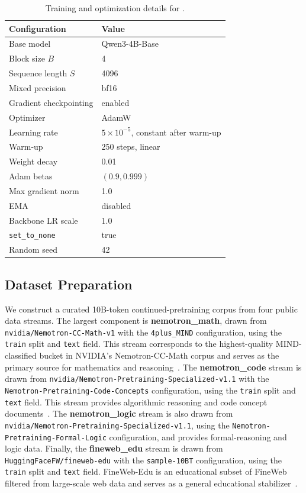 \begin{table}[!htbp]
\centering
\caption{
Training and optimization details for \method. 
}
\label{tab:training_details}
\setlength{\tabcolsep}{5pt}
\renewcommand{\arraystretch}{1.12}
\begin{tabular}{ll}
\toprule
\textbf{Configuration} & \textbf{Value} \\
\midrule
Base model & Qwen3-4B-Base \\
Block size $B$ & 4 \\
Sequence length $S$ & 4096 \\
Mixed precision & bf16 \\
Gradient checkpointing & enabled \\
\midrule
Optimizer & AdamW \\
Learning rate & $5\times10^{-5}$, constant after warm-up \\
Warm-up & 250 steps, linear \\
Weight decay & 0.01 \\
Adam betas & $(0.9, 0.999)$ \\
Max gradient norm & 1.0 \\
EMA & disabled \\
Backbone LR scale & 1.0 \\
\texttt{set\_to\_none} & true \\
Random seed & 42 \\
\bottomrule
\end{tabular}
\end{table}

\subsection{Dataset Preparation}
We construct a curated 10B-token continued-pretraining corpus from four public data streams. 
The largest component is \textbf{nemotron\_math}, drawn from \texttt{nvidia/Nemotron-CC-Math-v1} with the \texttt{4plus\_MIND} configuration, using the \texttt{train} split and \texttt{text} field. 
This stream corresponds to the highest-quality MIND-classified bucket in NVIDIA's Nemotron-CC-Math corpus and serves as the primary source for mathematics and reasoning~\citep {nemotron-cc-math}. 
The \textbf{nemotron\_code} stream is drawn from \texttt{nvidia/Nemotron-Pretraining-Specialized-v1.1} with the \texttt{Nemotron-Pretraining-Code-Concepts} configuration, using the \texttt{train} split and \texttt{text} field. 
This stream provides algorithmic reasoning and code concept documents~\citep{nemotron-code}. 
The \textbf{nemotron\_logic} stream is also drawn from \texttt{nvidia/Nemotron-Pretraining-Specialized-v1.1}, using the \texttt{Nemotron-Pretraining-Formal-Logic} configuration, and provides formal-reasoning and logic data. 
Finally, the \textbf{fineweb\_edu} stream is drawn from \texttt{HuggingFaceFW/fineweb-edu} with the \texttt{sample-10BT} configuration, using the \texttt{train} split and \texttt{text} field. 
FineWeb-Edu is an educational subset of FineWeb filtered from large-scale web data and serves as a general educational stabilizer~\citep{fineweb-edu}.

